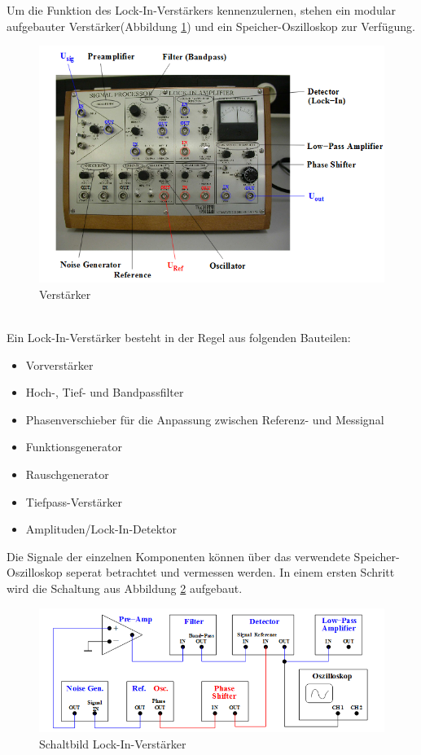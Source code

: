 Um die Funktion des Lock-In-Verstärkers kennenzulernen, stehen ein modular
aufgebauter Verstärker(Abbildung \ref{fig:verstärker}) und ein
Speicher-Oszilloskop zur Verfügung.
\begin{figure}[h]
  \centering
  \includegraphics[width=\textwidth]{Bilder/Verstaerker.jpeg}
  \caption{Verstärker}
  \label{fig:verstärker}
\end{figure}
\\
Ein Lock-In-Verstärker besteht in der Regel aus folgenden Bauteilen:
\begin{itemize}
  \item Vorverstärker
  \item Hoch-, Tief- und Bandpassfilter
  \item Phasenverschieber für die Anpassung zwischen Referenz- und Messignal
  \item Funktionsgenerator
  \item Rauschgenerator
  \item Tiefpass-Verstärker
  \item Amplituden/Lock-In-Detektor
\end{itemize}
Die Signale der einzelnen Komponenten können über das verwendete
Speicher-Oszilloskop seperat betrachtet und vermessen werden.
\newpage
In einem ersten Schritt wird die Schaltung aus Abbildung \ref{fig:schalt}
aufgebaut.
\begin{figure}[h]
  \centering
  \includegraphics[width=\textwidth]{Bilder/Schaltung.jpeg}
  \caption{Schaltbild Lock-In-Verstärker}
  \label{fig:schalt}
\end{figure}
